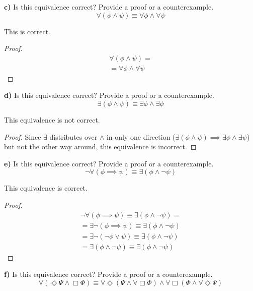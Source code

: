 \documentclass[titlepage, letterpaper, fleqn]{article}
\begin{document}
{\large \textbf{c)} Is this equivalence correct? Provide a proof or a counterexample.
\[\forall (\phi \wedge \psi) \equiv \forall \phi \wedge \forall \psi\]}

This is correct.

\begin{proof}
\begin{align*}
& \forall (\phi \wedge \psi) =
\\ & = \forall \phi \wedge \forall \psi & \tag*{$\forall$ distributes over $\wedge$ in both directions}
\end{align*}
\end{proof}

\pagebreak

{\large \textbf{d)} Is this equivalence correct? Provide a proof or a counterexample.
\[\exists (\phi \wedge \psi) \equiv \exists \phi \wedge \exists \psi\]}

This equivalence is not correct.

\begin{proof}
Since \(\exists\) distributes over \(\wedge\) in only one direction (\(\exists (\phi \wedge \psi) \implies \exists \phi \wedge \exists \psi\)) but not the other way around, this equivalence is incorrect.
\end{proof}

{\large \textbf{e)} Is this equivalence correct? Provide a proof or a counterexample.
\[\neg \forall(\phi \implies \psi) \equiv \exists (\phi \wedge \neg \psi)\]}

This equivalence is correct.

\begin{proof}
\begin{align*}
& \neg \forall(\phi \implies \psi) \equiv \exists (\phi \wedge \neg \psi) =
\\ & = \exists \neg (\phi \implies \psi) \equiv \exists (\phi \wedge \neg \psi) & \tag*{Duality of quantifiers}
\\ & = \exists \neg (\neg \phi \vee \psi) \equiv \exists (\phi \wedge \neg \psi) & \tag*{Material implication}
\\ & = \exists (\phi \wedge \neg \psi) \equiv \exists (\phi \wedge \neg \psi) & \tag*{de Morgan}
\end{align*}
\end{proof}

{\large \textbf{f)} Is this equivalence correct? Provide a proof or a counterexample.
\[\forall (\Diamond \Psi \wedge \Box \Phi) \equiv \forall \Diamond (\Psi \wedge \forall \Box \Phi) \wedge \forall \Box (\Phi \wedge \forall \Diamond \Psi)\]}
\end{document}
